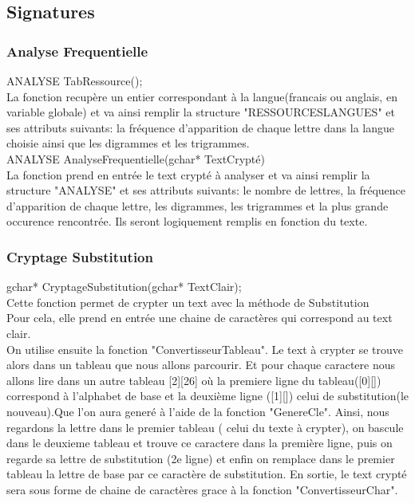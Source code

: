 \documentclass[a4]{article}
\begin{document}
		\subsection{Signatures}
		
	
	\subsubsection{Analyse Frequentielle}
	ANALYSE TabRessource();\\
		La fonction recupère un entier correspondant à la langue(francais ou anglais, en variable globale)
		et va ainsi remplir la structure "RESSOURCESLANGUES" et ses attributs suivants:
		la fréquence d'apparition de chaque lettre dans la langue choisie ainsi que les digrammes
		et les trigrammes.\\
		
		
		
	ANALYSE AnalyseFrequentielle(gchar* TextCrypté)\\
		La fonction prend en entrée le text crypté à analyser et va ainsi remplir la structure "ANALYSE" et 
		ses attributs suivants:
		le nombre de lettres, la fréquence d'apparition de chaque lettre, les digrammes, les trigrammes
		et la plus grande occurence rencontrée. Ils seront logiquement remplis en fonction du texte.\\
		
	\subsubsection{Cryptage Substitution}
	gchar* CryptageSubstitution(gchar* TextClair);\\
		Cette fonction permet de crypter un text avec la méthode de Substitution\\
		Pour cela, elle prend en entrée une chaine de caractères qui correspond au text clair.\\
		On utilise ensuite la fonction "ConvertisseurTableau".
		Le text à crypter se trouve alors dans un tableau que nous allons parcourir. Et pour chaque caractere 
		nous allons lire dans un autre tableau [2][26] où la premiere ligne du tableau([0][]) correspond à l'alphabet
		de base et la deuxième ligne ([1][]) celui de substitution(le nouveau).Que l'on aura generé à l'aide de la fonction "GenereCle". Ainsi, nous regardons la lettre dans 
		le premier tableau ( celui du texte à crypter), on bascule dans le deuxieme tableau et trouve ce caractere dans la première ligne, puis on regarde sa lettre de substitution (2e ligne) et enfin on remplace dans le premier tableau 
		la lettre de base par ce caractère de substitution. En sortie, le text crypté sera sous forme de chaine de caractères grace à la fonction "ConvertisseurChar".
		
\end{document}
